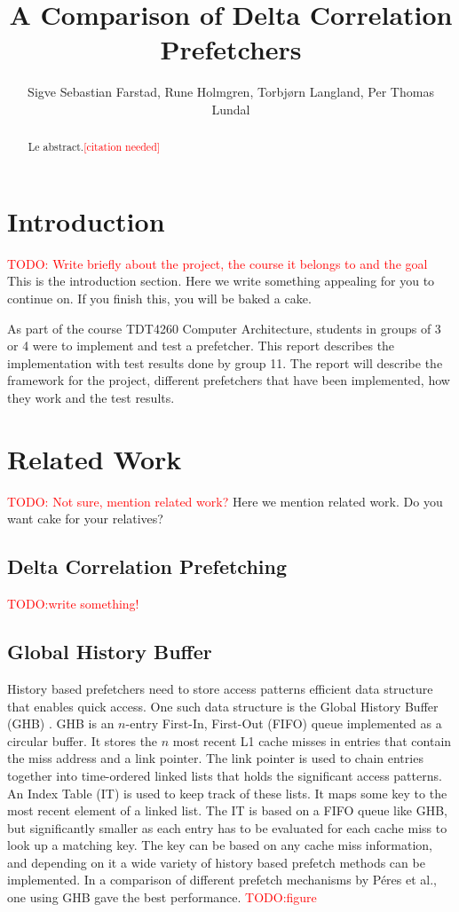 \documentclass[a4paper]{IEEEtran}
\title{A Comparison of Delta Correlation Prefetchers}
\author{
    Sigve Sebastian Farstad,
    Rune Holmgren,
    Torbjørn Langland,
    Per Thomas Lundal
}
\newcommand\TODO[1]{\textcolor{red}{TODO:#1}}
\newcommand\todo[1]{\TODO{#1}}
\newcommand\cn{\textcolor{red}{[citation needed]}}
\begin{document}
\maketitle

\begin{abstract}
    Le abstract.\cn
\end{abstract}

\section{Introduction}

\todo{ Write briefly about the project, the course it belongs to and the goal}
This is the introduction section.
Here we write something appealing for you to continue on.
If you finish this, you will be baked a cake.

As part of the course TDT4260 Computer Architecture, students in groups of 3 or 4 were to implement and test a prefetcher.
This report describes the implementation with test results done by group 11.
The report will describe the framework for the project, different prefetchers that have been implemented, how they work and the test results.

\section{Related Work}

\todo{ Not sure, mention related work?}
Here we mention related work. Do you want cake for your relatives?

\subsection{Delta Correlation Prefetching}
\todo{write something!}

\subsection{Global History Buffer}
History based prefetchers need to store access patterns efficient data structure that enables quick access.
One such data structure is the Global History Buffer (GHB) \cite{ghb}.
GHB is an $n$-entry First-In, First-Out (FIFO) queue implemented as a circular buffer.
It stores the $n$ most recent L1 cache misses in entries that contain the miss address and a link pointer.
The link pointer is used to chain entries together into time-ordered linked lists that holds the significant access patterns.
An Index Table (IT) is used to keep track of these lists.
It maps some key to the most recent element of a linked list.
The IT is based on a FIFO queue like GHB, but significantly smaller as each entry has to be evaluated for each cache miss to look up a matching key.
The key can be based on any cache miss information, and depending on it a wide variety of history based prefetch methods can be implemented.
In a comparison of different prefetch mechanisms by Péres et al.\cite{microlib}, one using GHB gave the best performance.
\todo{figure}
\end{document}
